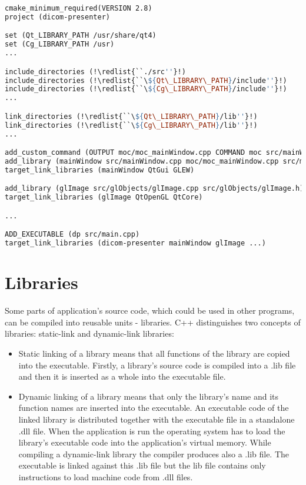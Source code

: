 \begin{lstlisting}[caption={CMake script for application compilation.}, language=make, morekeywords={cmake_minimum_required, project, set, include_directories, link_directories, add_custom_command, OUTPUT, COMMAND, add_library, target_link_libraries, ADD_EXECUTABLE},keywordstyle=\small\color{LightGreen}]
cmake_minimum_required(VERSION 2.8)
project (dicom-presenter)

set (Qt_LIBRARY_PATH /usr/share/qt4)
set (Cg_LIBRARY_PATH /usr)
...

include_directories (!\redlist{``./src''}!)
include_directories (!\redlist{``\${Qt\_LIBRARY\_PATH}/include''}!)
include_directories (!\redlist{``\${Cg\_LIBRARY\_PATH}/include''}!)
...

link_directories (!\redlist{``\${Qt\_LIBRARY\_PATH}/lib''}!)
link_directories (!\redlist{``\${Cg\_LIBRARY\_PATH}/lib''}!)
...

add_custom_command (OUTPUT moc/moc_mainWindow.cpp COMMAND moc src/mainWindow.h > moc/moc_mainWindow.cpp)
add_library (mainWindow src/mainWindow.cpp moc/moc_mainWindow.cpp src/mainWindow.h)
target_link_libraries (mainWindow QtGui GLEW)

add_library (glImage src/glObjects/glImage.cpp src/glObjects/glImage.h)
target_link_libraries (glImage QtOpenGL QtCore)

...

ADD_EXECUTABLE (dp src/main.cpp)
target_link_libraries (dicom-presenter mainWindow glImage ...)
\end{lstlisting}

\section{Libraries}
Some parts of application's source code, which could be used in other programs, can be compiled into reusable units - libraries. C++ distinguishes two concepts of libraries: static-link and dynamic-link libraries:

\begin{itemize}
\item Static linking of a library means that all functions of the library are copied into the executable. Firstly, a library's source code is compiled into a .lib file and then it is inserted as a whole into the executable file.
\item Dynamic linking of a library means that only the library's name and its function names are inserted into the executable. An executable code of the linked library is distributed together with the executable file in a standalone .dll file. When the application is run the operating system has to load the library's executable code into the application's virtual memory. While compiling a dynamic-link library the compiler produces also a .lib file. The executable is linked against this .lib file but the lib file contains only instructions to load machine code from .dll files.
\end{itemize}

